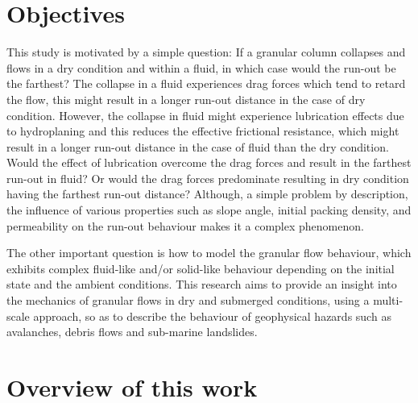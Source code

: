 \section{Objectives}

This study is motivated by a simple question: If a granular column collapses 
and flows in a dry condition and within a fluid, in which case would the 
run-out be the farthest? The collapse in a fluid experiences drag forces which 
tend to retard the flow, this might result in a longer run-out distance in the 
case of dry condition. However, the collapse in fluid might experience 
lubrication effects due to hydroplaning and this reduces the effective 
frictional resistance, which might result in a longer run-out distance in the 
case of fluid than the dry condition. Would the effect of lubrication overcome 
the drag forces and result in the farthest run-out in fluid? Or would the drag 
forces predominate resulting in dry condition having the farthest run-out 
distance? Although, a simple problem by description, the influence of various 
properties such as slope angle, initial packing density, and permeability on 
the run-out behaviour makes it a complex phenomenon.

The other important question is how to model the granular flow behaviour, which 
exhibits complex fluid-like and/or solid-like behaviour depending on the 
initial state and the ambient conditions. This research aims to 
provide an insight into the mechanics of granular flows in dry and 
submerged conditions, using a multi-scale approach, so as to describe the 
behaviour of geophysical hazards such as avalanches, debris flows and 
sub-marine landslides.

\section{Overview of this work}

